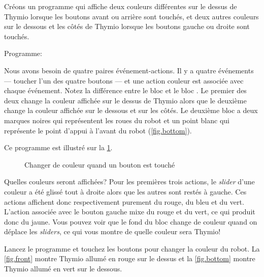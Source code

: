\label{ch.colors}


Créons un programme qui affiche deux couleurs différentes sur le dessus de Thymio lorsque les boutons avant ou arrière sont touchés, et deux autres couleurs sur le dessous et les côtés de Thymio lorsque les boutons gauche ou droite sont touchés.

{\raggedleft \hfill Programme: }

Nous avons besoin de quatre paires événement-actions.
Il y a quatre événements --- toucher l'un des quatre boutons --- et une action couleur est associée avec chaque événement.
Notez la différence entre le bloc  et le bloc .
Le premier des deux change la couleur affichée sur le dessus de Thymio alors que le deuxième change la couleur affichée sur le dessous et sur les côtés.
Le deuxième bloc a deux marques noires qui représentent les roues du robot et un point blanc qui représente le point d'appui à l'avant du robot (\cref{fig.bottom}).

Ce programme est illustré sur la \cref{fig.colors}.

\begin{figure}
\caption{Changer de couleur quand un bouton est touché}\label{fig.colors}
\end{figure}

Quelles couleurs seront affichées?
Pour les premières trois actions, le \textit{slider} d'une couleur a été glissé tout à droite alors que les autres sont restés à gauche.
Ces actions affichent donc respectivement purement du rouge, du bleu et du vert.
L'action associée avec le bouton gauche mixe du rouge et du vert, ce qui produit donc du jaune.
Vous pouvez voir que le fond du bloc change de couleur quand on déplace les \textit{sliders}, ce qui vous montre de quelle couleur sera Thymio!

Lancez le programme  et touchez les boutons pour changer la couleur du robot.
La \cref{fig.front} montre Thymio allumé en rouge sur le dessus et la \cref{fig.bottom} montre Thymio allumé en vert sur le dessous.



